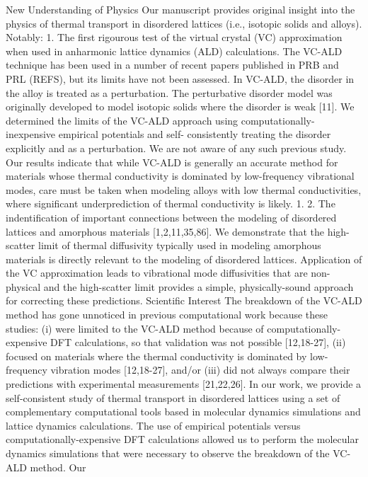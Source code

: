 New Understanding of Physics 
Our manuscript provides original insight into the physics of thermal 
transport in disordered lattices (i.e., isotopic solids and alloys). 
Notably:
1. The first rigourous test of the virtual crystal (VC) approximation 
when used in anharmonic lattice dynamics (ALD) calculations. The VC-ALD 
technique has been used in a number of recent papers published in PRB 
and PRL (REFS), but its limits have not been assessed.  In VC-ALD, 
the disorder in the alloy is treated as a perturbation. The perturbative 
disorder model was originally developed to model isotopic solids where 
the disorder is weak [11]. We determined the limits of the VC-ALD 
approach using computationally-inexpensive empirical potentials and 
self- consistently treating the disorder explicitly and as a 
perturbation. We are not aware of any such previous study. Our results 
indicate that while VC-ALD is generally an accurate method for materials 
whose thermal conductivity is dominated by low-frequency vibrational 
modes, care must be taken when modeling alloys with low thermal 
conductivities, where significant underprediction of thermal 
conductivity is likely. 
1. 2. The indentification of important connections between the modeling 
of disordered lattices and amorphous materials [1,2,11,35,86]. We 
demonstrate that the high-scatter limit of thermal diffusivity 
typically used in modeling amorphous materials is directly relevant 
to the modeling of disordered lattices. Application of the VC 
approximation leads to vibrational mode diffusivities that are 
non-physical and the high-scatter limit provides a simple, 
physically-sound approach for correcting these predictions. 
Scientific Interest
The breakdown of the VC-ALD method has gone unnoticed in previous 
computational work because these studies: (i) were limited to the 
VC-ALD method because of computationally-expensive DFT calculations, 
so that validation was not possible [12,18-27], (ii) focused on 
materials where the thermal conductivity is dominated by low-frequency 
vibration modes [12,18-27], and/or (iii) did not always compare their 
predictions with experimental measurements [21,22,26]. 
In our work, we provide a self-consistent study of thermal transport 
in disordered lattices using a set of complementary computational tools 
based in molecular dynamics simulations and lattice dynamics calculations. 
The use of empirical potentials versus computationally-expensive DFT 
calculations allowed us to perform the molecular dynamics simulations 
that were necessary to observe the breakdown of the VC-ALD method. Our 
